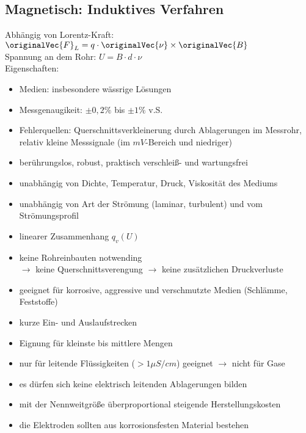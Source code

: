 \subsection{Magnetisch: Induktives Verfahren}
Abhängig von Lorentz-Kraft: $\originalVec{F}_L=q\cdot \originalVec{\nu} \times \originalVec{B}$\\
Spannung an dem Rohr: $U=B\cdot d \cdot \nu$\\
Eigenschaften:
\begin{itemize}
\item Medien: insbesondere wässrige Lösungen
\item Messgenaugikeit: $\pm 0,2\%$ bis $\pm 1\%$ v.S.
\item Fehlerquellen: Querschnittsverkleinerung durch Ablagerungen im Messrohr, relativ kleine Messsignale (im $\unit{mV}$-Bereich und niedriger)
\end{itemize}
\begin{itemize}[label=$+$]
\item berührungslos, robust, praktisch verschleiß- und wartungsfrei
\item unabhängig von Dichte, Temperatur, Druck, Viskosität des Mediums
\item unabhängig von Art der Strömung (laminar, turbulent) und vom Strömungsprofil
\item linearer Zusammenhang $q_v(U)$
\item keine Rohreinbauten notwending\\
$\to$  keine Querschnittsverengung $\to$ keine zusätzlichen Druckverluste
\item geeignet für korrosive, aggressive und verschmutzte Medien (Schlämme, Feststoffe)
\item kurze Ein- und Auslaufstrecken
\item Eignung für kleinste bis mittlere Mengen
\end{itemize}
\begin{itemize}[label=$-$]
\item nur für leitende Flüssigkeiten ($> 1 \unit{\mu S/cm}$) geeignet $\to$ nicht für Gase
\item es dürfen sich keine elektrisch leitenden Ablagerungen bilden
\item mit der Nennweitgröße überproportional steigende Herstellungskosten
\item die Elektroden sollten aus korrosionsfesten Material bestehen
\end{itemize}

